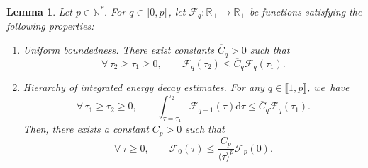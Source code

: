 \documentclass[JEP,XML,SOM,Unicode,published]{cedram}
\theoremstyle{plain}
\newtheorem{lemma}[proposition]{Lemma}
\theoremstyle{definition}
\newcommand\R{{\mathbb{R}}}
\newcommand\dr{{\mathrm{d}}}
\begin{document}
\begin{lemma}\label{Lemrpmethod}
Let $p \in \mathbb{N}^*$. For $q \in \llbracket 0, p \rrbracket$, let $\mathcal{F}_q \colon \R_+ \to \R_+$ be functions satisfying the following properties:
\begin{enumerate}
\item \label{assum1unifbound} Uniform boundedness. There exist constants $\overline{C}_q >0$ such that
\[
\forall \, \tau_2 \geq \tau_1 \geq 0,\qquad \mathcal{F}_q (\tau_2) \leq \overline{C}_q \mathcal{F}_q (\tau_1).
\]
\item \label{assum2hierenergest} Hierarchy of integrated energy decay estimates. For any $q \in \llbracket 1, p \rrbracket$, we~have
\[
\forall \, \tau_1 \geq \tau_2 \geq 0,\qquad \int_{\tau=\tau_1}^{\tau_2} \mathcal{F}_{q-1}(\tau) \dr \tau \leq \overline{C}_q \mathcal{F}_q (\tau_1).
\]
Then, there exists a constant $C_p>0$ such that
\[
\forall \, \tau \geq 0, \qquad \mathcal{F}_0(\tau) \leq \frac{C_p}{\langle \tau\rangle^p} \mathcal{F}_p(0).
\]
\end{enumerate}
\end{lemma}
\end{document}
